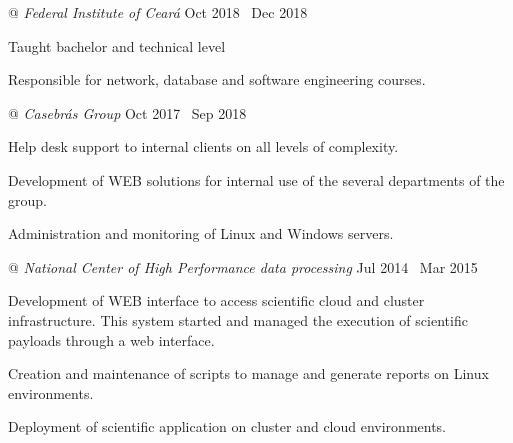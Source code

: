 \newlength{\lcolwidth}
\setlength{\lcolwidth}{.8\textwidth}
\newlength{\rcolwidth}
\setlength{\rcolwidth}{\dimexpr(\textwidth - \lcolwidth)\relax}





 @ \textit{Federal Institute of Ceará} \dotfill \enspace Oct 2018 \textemdash\  Dec 2018
\begin{minipage}[t]{\lcolwidth}
\raggedright
{\small \begin{zitemize}
  \item Taught bachelor and technical level

  \item Responsible for network, database and software engineering courses.
\end{zitemize}}
\end{minipage}%
\begin{minipage}[t]{\rcolwidth}
\raggedleft
{}
\end{minipage}
\enskip


 @ \textit{Casebrás Group} \dotfill \enspace Oct 2017 \textemdash\  Sep 2018
\begin{minipage}[t]{\lcolwidth}
\raggedright
{\small \begin{zitemize}
  \item Help desk support to internal clients on all levels of complexity.

  \item Development of WEB solutions for internal use of the several departments of the group.

  \item Administration and monitoring of Linux and Windows servers.
\end{zitemize}}
\end{minipage}%
\begin{minipage}[t]{\rcolwidth}
\raggedleft
{}
\end{minipage}
\enskip




 @ \textit{National Center of High Performance data processing} \dotfill \enspace Jul 2014 \textemdash\  Mar 2015
\begin{minipage}[t]{\lcolwidth}
\raggedright
{\small \begin{zitemize}
  \item Development of WEB interface to access scientific cloud and cluster infrastructure. This system started and managed the execution of scientific payloads through a web interface.

  \item Creation and maintenance of scripts to manage and generate reports on Linux environments.

  \item Deployment of scientific application on cluster and cloud environments.
\end{zitemize}}
\end{minipage}%
\begin{minipage}[t]{\rcolwidth}
\raggedleft
{}
\end{minipage}
